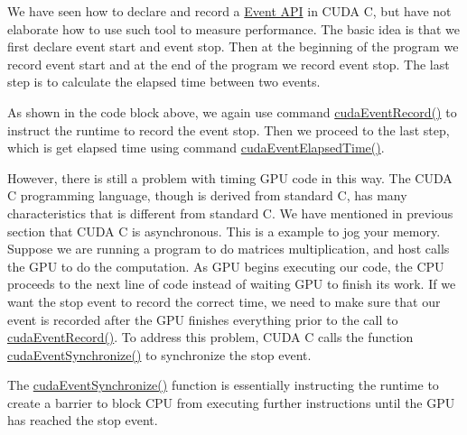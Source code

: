 \documentclass[letterpaper,10pt,openany,oneside]{sphinxmanual}
\begin{document}
We have seen how to declare and record a \href{http://developer.download.nvidia.com/compute/cuda/4\_2/rel/toolkit/docs/online/group\_\_CUDART\_\_MEMORY\_g48efa06b81cc031b2aa6fdc2e9930741.html\#g48efa06b81cc031b2aa6fdc2e9930741}{Event API} in CUDA C, but have not elaborate how to use such tool to measure performance. The basic idea is that we first declare event start and event stop. Then at the beginning of the program we record event start and at the end of the program we record event stop. The last step is to calculate the elapsed time between two events.

As shown in the code block above, we again use command \href{http://developer.download.nvidia.com/compute/cuda/4\_2/rel/toolkit/docs/online/group\_\_CUDART\_\_EVENT\_ga324d5ce3fbf46899b15e5e42ff9cfa5.html\#ga324d5ce3fbf46899b15e5e42ff9cfa5}{cudaEventRecord()} to instruct the runtime to record the event stop. Then we proceed to the last step, which is get elapsed time using command \href{http://developer.download.nvidia.com/compute/cuda/4\_2/rel/toolkit/docs/online/group\_\_CUDART\_\_EVENT\_g14c387cc57ce2e328f6669854e6020a5.html\#g14c387cc57ce2e328f6669854e6020a5}{cudaEventElapsedTime()}.

However, there is still a problem with timing GPU code in this way. The CUDA C programming language, though is derived from standard C, has many characteristics that is different from standard C. We have mentioned in previous section that CUDA C is asynchronous. This is a example to jog your memory. Suppose we are running a program to do matrices multiplication, and host calls the GPU to do the computation. As GPU begins executing our code, the CPU proceeds to the next line of code instead of waiting GPU to finish its work. If we want the stop event to record the correct time, we need to make sure that our event is recorded after the GPU finishes everything prior to the call to \href{http://developer.download.nvidia.com/compute/cuda/4\_2/rel/toolkit/docs/online/group\_\_CUDART\_\_EVENT\_ga324d5ce3fbf46899b15e5e42ff9cfa5.html\#ga324d5ce3fbf46899b15e5e42ff9cfa5}{cudaEventRecord()}. To address this problem, CUDA C calls the function \href{http://developer.download.nvidia.com/compute/cuda/4\_2/rel/toolkit/docs/online/group\_\_CUDART\_\_EVENT\_g08241bcf5c5cb686b1882a8492f1e2d9.html\#g08241bcf5c5cb686b1882a8492f1e2d9}{cudaEventSynchronize()} to synchronize the stop event.

The \href{http://developer.download.nvidia.com/compute/cuda/4\_2/rel/toolkit/docs/online/group\_\_CUDART\_\_EVENT\_g08241bcf5c5cb686b1882a8492f1e2d9.html\#g08241bcf5c5cb686b1882a8492f1e2d9}{cudaEventSynchronize()} function is essentially instructing the runtime to create a barrier to block CPU from executing further instructions until the GPU has reached the stop event.
\end{document}
